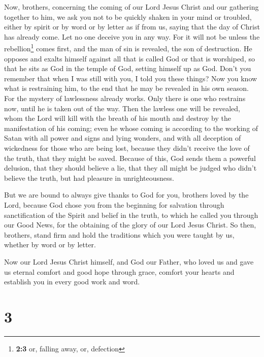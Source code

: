  Now, brothers, concerning the coming of our Lord Jesus
Christ and our gathering together to him, we ask you  not
to be quickly shaken in your mind or troubled, either by spirit or by
word or by letter as if from us, saying that the day of Christ has
already come.  Let no one deceive you in any way. For it
will not be unless the rebellion\footnote{\textbf{2:3} or, falling away,
  or, defection} comes first, and the man of sin is revealed, the son of
destruction.  He opposes and exalts himself against all
that is called God or that is worshiped, so that he sits as God in the
temple of God, setting himself up as God.  Don't you
remember that when I was still with you, I told you these things?
 Now you know what is restraining him, to the end that he
may be revealed in his own season.  For the mystery of
lawlessness already works. Only there is one who restrains now, until he
is taken out of the way.  Then the lawless one will be
revealed, whom the Lord will kill with the breath of his mouth and
destroy by the manifestation of his coming;  even he whose
coming is according to the working of Satan with all power and signs and
lying wonders,  and with all deception of wickedness for
those who are being lost, because they didn't receive the love of the
truth, that they might be saved.  Because of this, God
sends them a powerful delusion, that they should believe a lie,
 that they all might be judged who didn't believe the
truth, but had pleasure in unrighteousness.

 But we are bound to always give thanks to God for you,
brothers loved by the Lord, because God chose you from the beginning for
salvation through sanctification of the Spirit and belief in the truth,
 to which he called you through our Good News, for the
obtaining of the glory of our Lord Jesus Christ.  So
then, brothers, stand firm and hold the traditions which you were taught
by us, whether by word or by letter.

 Now our Lord Jesus Christ himself, and God our Father,
who loved us and gave us eternal comfort and good hope through grace,
 comfort your hearts and establish you in every good work
and word.

\hypertarget{section-2}{%
\section{3}\label{section-2}}

